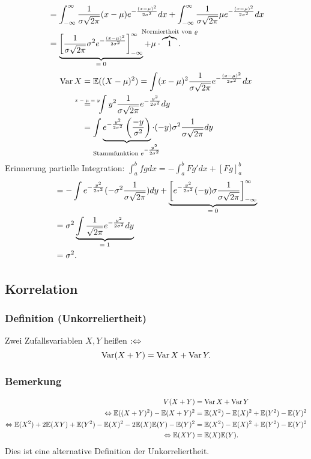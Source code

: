 {\begin{align*}
&=\int_{-\infty}^{\infty}\frac{1}{\sigma\sqrt{2\pi}}(x-\mu)e^{-\frac{(x-\mu)^2}{2\sigma^2}}dx
+\int_{-\infty}^{\infty}\frac{1}{\sigma\sqrt{2\pi}}\mu e^{-\frac{(x-\mu)^2}{2\sigma^2}}dx\\
&=\ubr{\left[\frac{1}{\sigma\sqrt{2\pi}}\sigma^2e^{-\frac{(x-\mu)^2}{2\sigma^2}}\right]_{-\infty}^\infty}{$=0$}
+\mu\cdot\obr{1}{Normiertheit von $\varrho$}.
\end{align*}
\begin{align*}
\Var X&=\mathbb{E}((X-\mu)^2)=\int(x-\mu)^2\frac{1}{\sigma\sqrt{2\pi}}e^{-\frac{(x-\mu)^2}{2\sigma^2}}dx\\
&\textabove{$x-\mu=y$}{=}\ \ \int y^2\frac{1}{\sigma\sqrt{2\pi}}e^{-\frac{y^2}{2\sigma^2}}dy\\
&=\int \ubr{e^{-\frac{y^2}{2\sigma^2}}\left(\frac{-y}{\sigma^2}\right)}{Stammfunktion $e^{-\frac{y^2}{2\sigma^2}}$}\cdot(-y)\sigma^2\frac{1}{\sigma\sqrt{2\pi}}dy\\
\end{align*}
Erinnerung partielle Integration: $\int_a^bfgdx=-\int_a^bFg'dx+[Fg]_a^b$
\begin{align*}
&=-\int e^{-\frac{y^2}{2\sigma^2}}(-\sigma^2\frac{1}{\sigma\sqrt{2\pi}})dy
+\ubr{\left[e^{-\frac{y^2}{2\sigma^2}}(-y)\sigma\frac{1}{\sigma\sqrt{2\pi}}\right]_{-\infty}^\infty}{$=0$}\\
&=\sigma^2\ubr{\int\frac{1}{\sqrt{2\pi}}e^{-\frac{y^2}{2\sigma^2}}dy}{$=1$}\\
&=\sigma^2.
\end{align*}
}
\subsection{Korrelation}
\subsubsection{Definition (Unkorreliertheit)}
Zwei Zufallsvariablen $X,Y$ hei\ss{}en  $:\Leftrightarrow$
\[
\operatorname{Var}(X+Y)=\operatorname{Var} X+\operatorname{Var} Y.
\]
\subsubsection{Bemerkung}
\begin{align*}
V(X+Y)&=\operatorname{Var} X+\operatorname{Var} Y\\
\Leftrightarrow\mathbb{E}((X+Y)^2)-\mathbb{E}(X+Y)^2&=\mathbb{E}(X^2)-\mathbb{E}(X)^2+\mathbb{E}(Y^2)-\mathbb{E}(Y)^2\\
\Leftrightarrow\mathbb{E}(X^2)+2\mathbb{E}(XY)+\mathbb{E}(Y^2)-\mathbb{E}(X)^2-2\mathbb{E}(X)\mathbb{E}(Y)-\mathbb{E}(Y)^2&=\mathbb{E}(X^2)-\mathbb{E}(X)^2+\mathbb{E}(Y^2)-\mathbb{E}(Y)^2\\
\Leftrightarrow\mathbb{E}(XY)&=\mathbb{E}(X)\mathbb{E}(Y).
\end{align*}
Dies ist eine alternative Definition der Unkorreliertheit.

